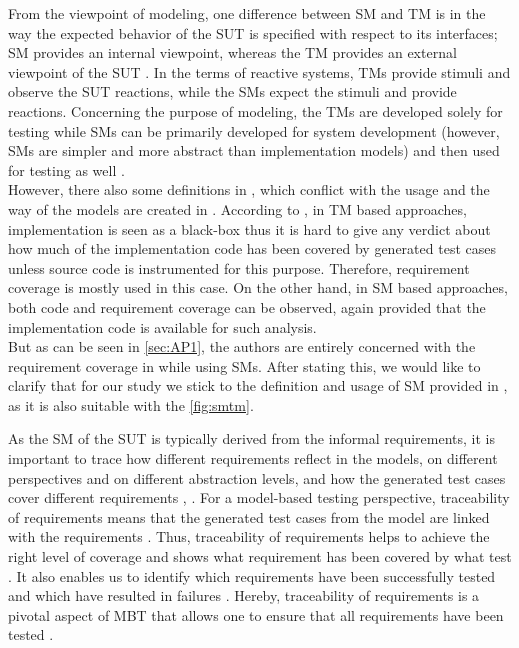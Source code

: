 From the viewpoint of modeling, one difference between SM and TM is in the way the expected behavior of the SUT is specified with respect to its interfaces; SM provides an internal viewpoint, whereas the TM provides an external viewpoint of the SUT \cite{SMvsTM}. In the terms of reactive systems, TMs provide stimuli and observe the SUT reactions, while the SMs expect the stimuli and provide reactions. Concerning the purpose of modeling, the TMs are developed solely for testing while SMs can be primarily developed for system development (however, SMs are simpler and more abstract than implementation models) and then used for testing as well \cite{SMvsTM}. \\
However, there also some definitions in \cite{SMvsTM}, which conflict with the usage and the way of the models are created in \cite{Paper1}. According to \cite{SMvsTM}, in TM based approaches, implementation is seen as a black-box thus it is hard to give any verdict about how much of the implementation code has been covered by generated test cases unless source code is instrumented for this purpose. Therefore, requirement coverage is mostly used in this case. On the other hand, in SM based approaches, both code and requirement coverage can be observed, again provided that the implementation code is available for such analysis. \\
But as can be seen in \autoref{sec:AP1}, the authors are entirely concerned with the requirement coverage in \cite{Paper1} while using SMs. After stating this, we would like to clarify that for our study we stick to the definition and usage of SM provided in \cite{Paper1}, as it is also suitable with the \autoref{fig:smtm}.

As the SM of the SUT is typically derived from the informal requirements, it is important to trace how different requirements reflect in the models, on different perspectives and on different abstraction levels, and how the generated test cases cover different requirements \cite{Paper1}, \cite{SMvsTM}. For a model-based testing perspective, traceability of requirements means that the generated test cases from the model are linked with the requirements \cite{Paper2}. Thus, traceability of requirements helps to achieve the right level of coverage and shows what requirement has been covered by what test \cite{Paper1}. It also enables us to identify which requirements have been successfully tested and which have resulted in failures \cite{Paper1}. Hereby, traceability of requirements is a pivotal aspect of MBT that allows one to ensure that all requirements have been tested  \cite{matera}.

